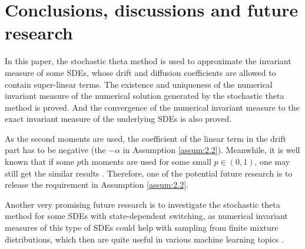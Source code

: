 \documentclass{article}
\begin{document}
\section{Conclusions, discussions and future research}\label{sec:conclusion}
In this paper, the stochastic theta method is used to approximate the invariant measure of some SDEs, whose drift and diffusion coefficients are allowed to contain super-linear terms. The existence and uniqueness of the numerical invariant measure of the numerical solution generated by the stochastic theta method is proved. And the convergence of the numerical invariant measure to the exact invariant measure of the underlying SDEs is also proved.
\par
As the second moments are used, the coefficient of the linear term in the drift part has to be negative (the $-\alpha$ in Assumption \ref{assum:2.2}). Meanwhile, it is well known that if some $p$th moments are used for some small $p\in(0,1)$, one may still get the similar results \cite{LiMaYangYuan2018}. Therefore, one of the potential future research is to release the requirement in Assumption \ref{assum:2.2}.
\par
Another very promising future research is to investigate the stochastic theta method for some SDEs with state-dependent switching, as numerical invariant measures of this type of SDEs could help with sampling from finite mixture distributions, which then are quite useful in various machine learning topics \cite{Tretyakov2025}.  





\end{document}
